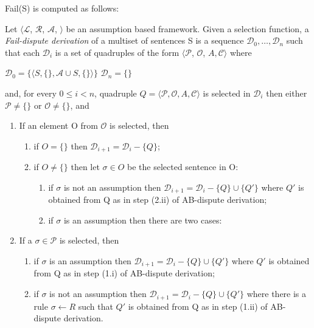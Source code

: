 Fail(S) is computed as follows:
\begin{defn} Let $\langle\mathcal{L}$, $\mathcal{R}$, $\mathcal{A}$, {\bf\textasciimacron} $\rangle$ be an assumption based framework. Given a selection function, a \emph{Fail-dispute derivation} of a multiset of sentences S is a sequence $\mathcal{D}_0,\ldots,\mathcal{D}_n$ such that each $\mathcal{D}_i$ is a set of quadruples of the form $\langle\mathcal{P}$, $\mathcal{O}$, $A, \mathcal{C} \rangle$ where
\\
\begin{multicols}{2}
$\mathcal{D}_0=\{\langle S,\{\},\mathcal{A}\cup S,\{\} \rangle\}$
\columnbreak
$\mathcal{D}_n=\{\}$
\end{multicols}

and, for every $0 \leq i < n$, quadruple $Q=\langle \mathcal{P}, \mathcal{O}, A, \mathcal{C} \rangle$ is selected in $\mathcal{D}_i$ then either $\mathcal{P} \neq \{\}$ or $\mathcal{O} \neq \{\}$, and

\begin{enumerate}
\item If an element O from $\mathcal{O}$ is selected, then
\begin{enumerate}
\item if $O=\{\}$ then $\mathcal{D}_{i+1}=\mathcal{D}_i - \{Q\}$;
\item if $O \neq \{\}$ then let $\sigma \in O$ be the selected sentence in O:
\begin{enumerate}
\item if $\sigma$ is not an assumption then $\mathcal{D}_{i+1}=\mathcal{D}_i-\{Q\}\cup\{Q'\}$ where $Q'$ is obtained from Q as in step (2.ii) of AB-dispute derivation;
\item if $\sigma$ is an assumption then there are two cases:
\end{enumerate}
\end{enumerate}
\item If a $\sigma \in \mathcal{P}$ is selected, then
\begin{enumerate}
\item if $\sigma$ is an assumption then $\mathcal{D}_{i+1}=\mathcal{D}_i-\{Q\}\cup\{Q'\}$ where $Q'$ is obtained from Q as in step (1.i) of AB-dispute derivation;
\item if $\sigma$ is not an assumption then $\mathcal{D}_{i+1}=\mathcal{D}_i-\{Q\}\cup\{Q'\}$ where there is a rule $\sigma \leftarrow R$ such that $Q'$ is obtained from Q as in step (1.ii) of AB-dispute derivation.
\end{enumerate}
\end{enumerate}
\end{defn}

